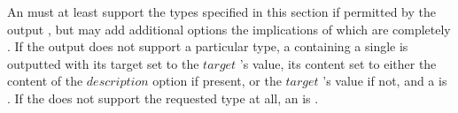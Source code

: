 An  must at least support the types specified in this section if permitted by the output , but may add additional options the implications of which are completely . If the output  does not support a particular type, a  containing a single   is outputted with its target set to the \inline$target$ 's value, its content set to either the content of the \inline$description$ option if present, or the \inline$target$ 's value if not, and a  is . If the  does not support the requested type at all, an  is . \\






